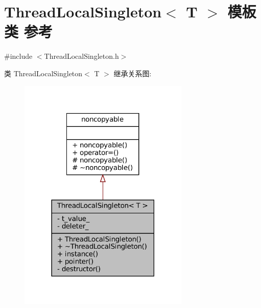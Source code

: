 \hypertarget{classmuduo_1_1ThreadLocalSingleton}{}\section{Thread\+Local\+Singleton$<$ T $>$ 模板类 参考}
\label{classmuduo_1_1ThreadLocalSingleton}


{\ttfamily \#include $<$Thread\+Local\+Singleton.\+h$>$}



类 Thread\+Local\+Singleton$<$ T $>$ 继承关系图\+:
\nopagebreak
\begin{figure}[H]
\begin{center}
\leavevmode
\includegraphics[width=230pt]{classmuduo_1_1ThreadLocalSingleton__inherit__graph}
\end{center}
\end{figure}



